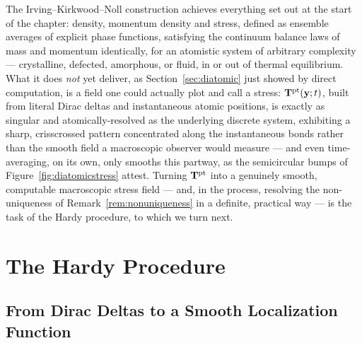 \bigskip
The Irving--Kirkwood--Noll construction achieves everything set out at the start of the chapter: density, momentum density and stress, defined as ensemble averages of explicit phase functions, satisfying the continuum balance laws of mass and momentum identically, for an atomistic system of arbitrary complexity --- crystalline, defected, amorphous, or fluid, in or out of thermal equilibrium. What it does \textit{not} yet deliver, as Section~\ref{sec:diatomic} just showed by direct computation, is a field one could actually plot and call a stress: $\mathbf{T}^{\rm pt}(\mathbf{y};t)$, built from literal Dirac deltas and instantaneous atomic positions, is exactly as singular and atomically-resolved as the underlying discrete system, exhibiting a sharp, crisscrossed pattern concentrated along the instantaneous bonds rather than the smooth field a macroscopic observer would measure --- and even time-averaging, on its own, only smooths this partway, as the semicircular bumps of Figure~\ref{fig:diatomicstress} attest. Turning $\mathbf{T}^{\rm pt}$ into a genuinely smooth, computable macroscopic stress field --- and, in the process, resolving the non-uniqueness of Remark~\ref{rem:nonuniqueness} in a definite, practical way --- is the task of the Hardy procedure, to which we turn next.

\chapter{The Hardy Procedure}\label{Hardy}

\section{From Dirac Deltas to a Smooth Localization Function}

